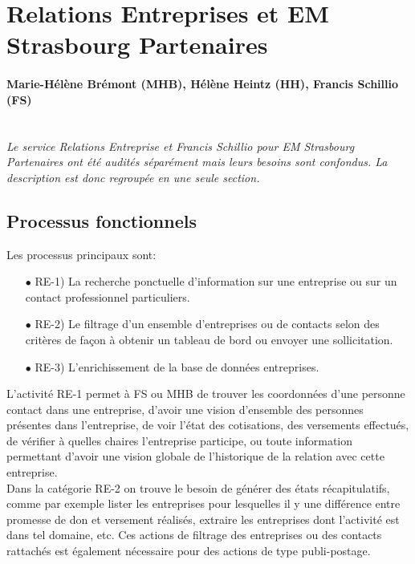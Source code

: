 \documentclass{book}
\begin{document}

\section{Relations Entreprises et EM Strasbourg Partenaires}

\paragraph{Marie-Hélène Brémont (MHB), Hélène Heintz (HH), Francis Schillio (FS)}
~\\

\textit{Le service Relations Entreprise et Francis Schillio pour 
EM Strasbourg Partenaires ont été audités séparément mais leurs 
besoins sont confondus. La description est donc regroupée en une 
seule section.}


\subsection{Processus fonctionnels}

Les processus principaux sont:
\begin{itemize}
\item[$\bullet$] RE-1) La recherche ponctuelle d'information sur une entreprise 
			     ou sur un contact professionnel particuliers.
\item[$\bullet$] RE-2) Le filtrage d'un ensemble d'entreprises ou de contacts
			     selon des critères de façon à obtenir un tableau de bord
			     ou envoyer une sollicitation. 
\item[$\bullet$] RE-3) L'enrichissement de la base de données entreprises.
\end{itemize}

\bigskip

L'activité RE-1 permet à FS ou MHB de trouver les coordonnées d'une personne
contact dans une entreprise, d'avoir une vision d'ensemble des personnes 
présentes dans l'entreprise, de voir l'état des cotisations, des versements
effectués, de vérifier à quelles chaires l'entreprise participe, ou toute
information permettant d'avoir une vision globale de l'historique de la 
relation avec cette entreprise.\\

Dans la catégorie RE-2 on trouve le besoin de générer des états récapitulatifs,
comme par exemple lister les entreprises pour lesquelles il y une différence
entre promesse de don et versement réalisés, extraire les entreprises dont 
l'activité est dans tel domaine, etc. Ces actions de filtrage des entreprises
ou des contacts rattachés est également nécessaire pour des actions de 
type publi-postage.\\
\end{document}
